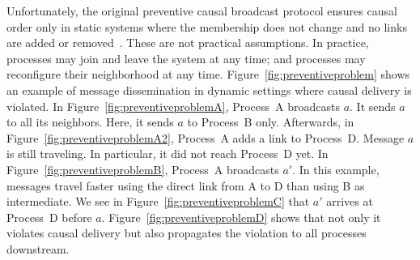 Unfortunately, the original preventive causal broadcast protocol ensures causal
order only in static systems where the membership does not change and no links
are added or removed~\cite{friedman2004causal}. These are not practical
assumptions.  In practice, processes may join and leave the system at any time;
and processes may reconfigure their neighborhood at any time.
Figure~\ref{fig:preventiveproblem} shows an example of message dissemination in
dynamic settings where causal delivery is violated. In
Figure~\ref{fig:preventiveproblemA}, Process~A broadcasts $a$. It sends $a$ to
all its neighbors. Here, it sends $a$ to Process~B only.  Afterwards, in
Figure~\ref{fig:preventiveproblemA2}, Process~A adds a link to
Process~D. Message $a$ is still traveling. In particular, it did not reach
Process~D yet. In Figure~\ref{fig:preventiveproblemB}, Process~A broadcasts
$a'$. In this example, messages travel faster using the direct link from A to D
than using B as intermediate.  We see in Figure~\ref{fig:preventiveproblemC}
that $a'$ arrives at Process~D before $a$. Figure~\ref{fig:preventiveproblemD}
shows that not only it violates causal delivery but also propagates the
violation to all processes downstream.


%     



